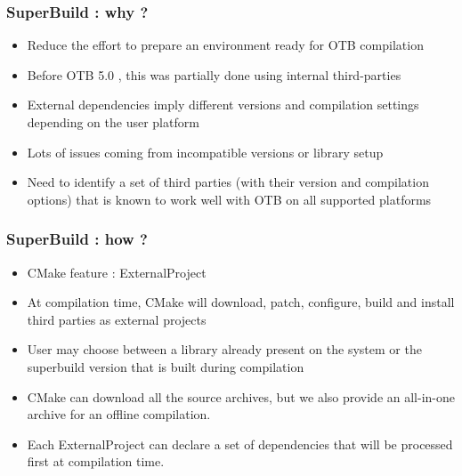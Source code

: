 \documentclass[8pt]{beamer}
\begin{document}
\begin{frame}
\frametitle{SuperBuild : why ?}

\begin{itemize}
\item Reduce the effort to prepare an environment ready for OTB compilation
\item Before OTB 5.0 , this was partially done using internal third-parties
\item External dependencies imply different versions and compilation settings depending on the user platform
\item Lots of issues coming from incompatible versions or library setup
\item Need to identify a set of third parties (with their version and compilation options) 
that is known to work well with OTB on all supported platforms
\end{itemize}

\end{frame}

\begin{frame}
\frametitle{SuperBuild : how ?}

\begin{itemize}
\item CMake feature : ExternalProject
\item At compilation time, CMake will download, patch, configure, build and install third parties as external projects
\item User may choose between a library already present on the system or the superbuild version that is built during compilation
\item CMake can download all the source archives, but we also provide an all-in-one archive for an offline compilation.
\item Each ExternalProject can declare a set of dependencies that will be processed first at compilation time.
\end{itemize}

\end{frame}
\end{document}
